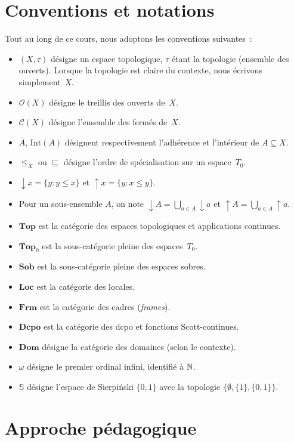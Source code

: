 \section*{Conventions et notations}

Tout au long de ce cours, nous adoptons les conventions suivantes~:
\begin{itemize}
  \item $(X,\tau)$ d\'esigne un espace topologique, $\tau$ \'etant la topologie (ensemble des
    ouverts). Lorsque la topologie est claire du contexte, nous \'ecrivons simplement~$X$.
  \item $\mathcal{O}(X)$ d\'esigne le treillis des ouverts de~$X$.
  \item $\mathcal{C}(X)$ d\'esigne l'ensemble des ferm\'es de~$X$.
  \item $\overline{A}$, $\mathrm{Int}(A)$ d\'esignent respectivement l'adh\'erence et
    l'int\'erieur de $A \subseteq X$.
  \item $\leq_X$ ou $\sqsubseteq$ d\'esigne l'ordre de sp\'ecialisation sur un espace~$T_0$.
  \item $\downarrow\! x = \{y : y \leq x\}$ et $\uparrow\! x = \{y : x \leq y\}$.
  \item Pour un sous-ensemble $A$, on note $\downarrow\! A = \bigcup_{a\in A}\downarrow\! a$
    et $\uparrow\! A = \bigcup_{a\in A}\uparrow\! a$.
  \item $\mathbf{Top}$ est la cat\'egorie des espaces topologiques et applications continues.
  \item $\mathbf{Top}_0$ est la sous-cat\'egorie pleine des espaces~$T_0$.
  \item $\mathbf{Sob}$ est la sous-cat\'egorie pleine des espaces sobres.
  \item $\mathbf{Loc}$ est la cat\'egorie des locales.
  \item $\mathbf{Frm}$ est la cat\'egorie des cadres (\emph{frames}).
  \item $\mathbf{Dcpo}$ est la cat\'egorie des dcpo et fonctions Scott-continues.
  \item $\mathbf{Dom}$ d\'esigne la cat\'egorie des domaines (selon le contexte).
  \item $\omega$ d\'esigne le premier ordinal infini, identifi\'e \`a $\mathbb{N}$.
  \item $\mathbb{S}$ d\'esigne l'espace de Sierpi\'nski $\{0,1\}$ avec la topologie
    $\{\emptyset, \{1\}, \{0,1\}\}$.
\end{itemize}

\section*{Approche p\'edagogique}

